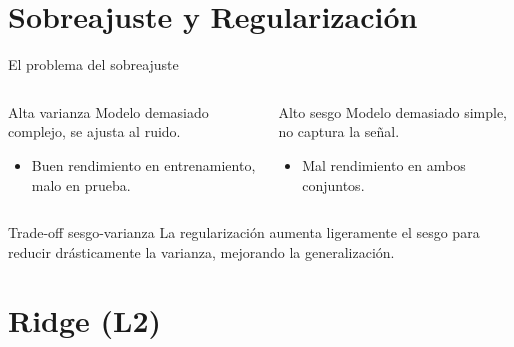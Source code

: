 \documentclass[aspectratio=169, 10pt, xcolor=table]{beamer}
\begin{document}
\section{Sobreajuste y Regularización}

\begin{frame}{El problema del sobreajuste}
    \begin{columns}[t]
        \begin{block}{Alta varianza}
            Modelo demasiado complejo, se ajusta al ruido.
            \begin{itemize}
                \item Buen rendimiento en entrenamiento, malo en prueba.
            \end{itemize}
        \end{block}
        \begin{block}{Alto sesgo}
            Modelo demasiado simple, no captura la señal.
            \begin{itemize}
                \item Mal rendimiento en ambos conjuntos.
            \end{itemize}
        \end{block}
    \end{columns}
    \vspace{0.3cm}
    \begin{exampleblock}{Trade-off sesgo-varianza}
        La regularización aumenta ligeramente el sesgo para reducir drásticamente la varianza, mejorando la generalización.
    \end{exampleblock}
\end{frame}

\section{Ridge (L2)}
\end{document}
